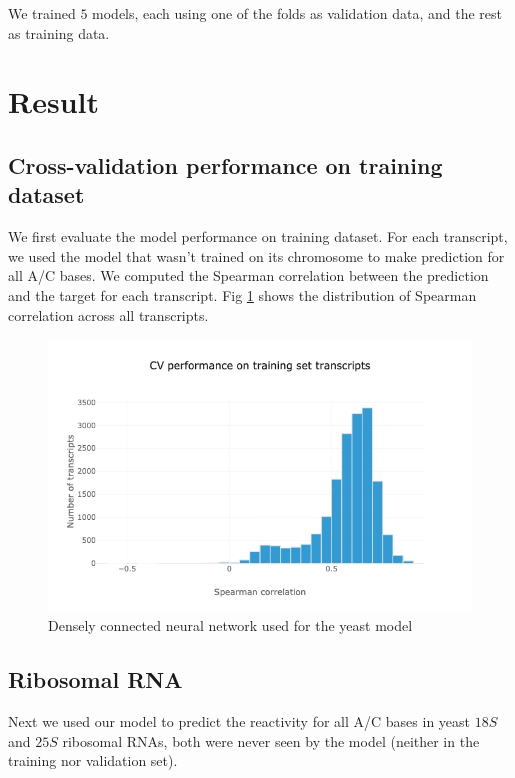\documentclass{proposal}
\begin{document}
We trained $5$ models, each using one of the folds as validation data, and the rest as training data.


\section{Result}


\subsection{Cross-validation performance on training dataset}

We first evaluate the model performance on training dataset.
For each transcript, we used the model that wasn't trained on its chromosome to make prediction for all A/C bases.
We computed the Spearman correlation between the prediction and the target for each transcript.
Fig \ref{fig:yeast_cv_performance} shows the distribution of Spearman correlation across all transcripts.

\begin{figure}[h!]
\includegraphics[width=\textwidth]{yeast_cv_performance.png}
\caption{Densely connected neural network used for the yeast model}
\label{fig:yeast_cv_performance}
\centering
\end{figure}

\subsection{Ribosomal RNA}

Next we used our model to predict the reactivity for all A/C bases in yeast $18S$ and $25S$ ribosomal RNAs,
both were never seen by the model (neither in the training nor validation set).
\end{document}

